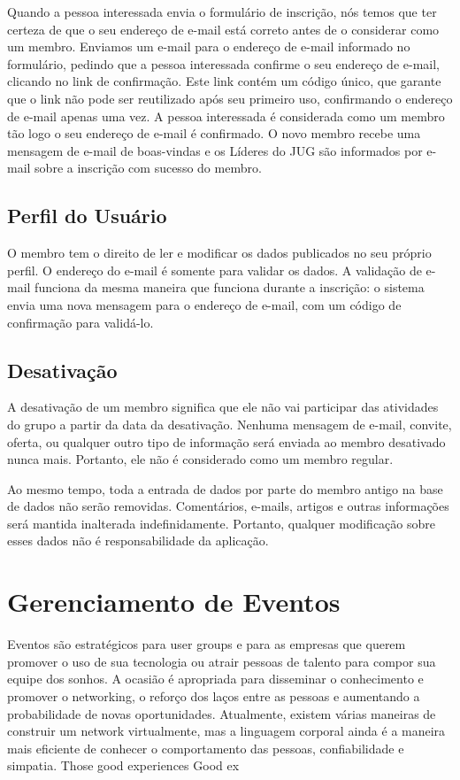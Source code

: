 \documentclass[envcountsame,envcountchap]{svmono}
\begin{document}
Quando a pessoa interessada envia o formulário de inscrição, nós temos que ter certeza de que o seu endereço de e-mail está correto antes de o considerar como um membro. Enviamos um e-mail para o endereço de e-mail informado no formulário, pedindo que a pessoa interessada confirme o seu endereço de e-mail, clicando no link de confirmação. Este link contém um código único, que garante que o link não pode ser reutilizado após seu primeiro uso, confirmando o endereço de e-mail apenas uma vez. A pessoa interessada é considerada como um membro tão logo o seu endereço de e-mail é confirmado. O novo membro recebe uma mensagem de e-mail de boas-vindas e os Líderes do JUG são informados por e-mail sobre a inscrição com sucesso do membro.

\section{Perfil do Usuário}

O membro tem o direito de ler e modificar os dados publicados no seu próprio perfil. O endereço do e-mail é somente para validar os dados. A validação de e-mail funciona da mesma maneira que funciona durante a inscrição: o sistema envia uma nova mensagem para o endereço de e-mail, com um código de confirmação para validá-lo.

\section{Desativação}

A desativação de um membro significa que ele não vai participar das atividades do grupo a partir da data da desativação. Nenhuma mensagem de e-mail, convite, oferta, ou qualquer outro tipo de informação será enviada ao membro desativado nunca mais. Portanto, ele não é considerado como um membro regular.

Ao mesmo tempo, toda a entrada de dados por parte do membro antigo na base de dados não serão removidas. Comentários, e-mails, artigos e outras informações será mantida inalterada indefinidamente. Portanto, qualquer modificação sobre esses dados não é responsabilidade da aplicação.

\chapter{Gerenciamento de Eventos}
\label{chp:event-management}

Eventos são estratégicos para user groups e para as empresas que querem promover o uso de sua tecnologia ou atrair pessoas de talento para compor sua equipe dos sonhos. A ocasião é apropriada para disseminar o conhecimento e promover o networking, o reforço dos laços entre as pessoas e aumentando a probabilidade de novas oportunidades. Atualmente, existem várias maneiras de construir um network virtualmente, mas a linguagem corporal ainda é a maneira mais eficiente de conhecer o comportamento das pessoas, confiabilidade e simpatia. Those good experiences Good ex
\end{document}
